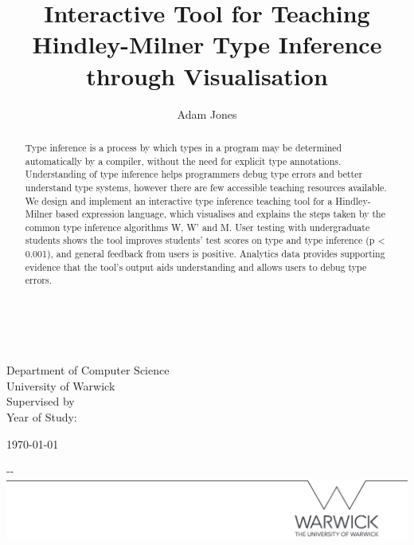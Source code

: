 \documentclass[a4paper,fleqn,twoside,12pt]{report}
\author{Adam Jones}
\title{Interactive Tool for Teaching Hindley-Milner Type Inference through Visualisation}
\makeatletter
\newcommand{\@supervisor}[0]{}
\newcommand{\@yearofstudy}[0]{}
\makeatother
\begin{document}
\makeatletter
\begin{titlepage}

	\textbf{\Huge \@title} \\[1.5cm]
    \Large \textbf{\@author} \\
    Department of Computer Science \\
    University of Warwick \\

	Supervised by \@supervisor \\
	Year of Study: \@yearofstudy \\

    \vfill
\vfill 
    \vfill
\vfill 
    \vfill

    \today

    \begin{adjustwidth}{-\oddsidemargin-1in}{-\rightmargin}
        \centering
        \includegraphics[width=\paperwidth]{./line.png}
    \end{adjustwidth}

    \vspace*{-3.5cm}

\end{titlepage}
\makeatother

\pagestyle{plain}

\begin{abstract}
  Type inference is a process by which types in a program may be determined automatically by a compiler, without the need for explicit type annotations. Understanding of type inference helps programmers debug type errors and better understand type systems, however there are few accessible teaching resources available. We design and implement an interactive type inference teaching tool for a Hindley-Milner based expression language, which visualises and explains the steps taken by the common type inference algorithms W, W’ and M. User testing with undergraduate students shows the tool improves students' test scores on type and type inference (p < 0.001), and general feedback from users is positive. Analytics data provides supporting evidence that the tool’s output aids understanding and allows users to debug type errors.
\end{abstract}

\tableofcontents
\end{document}
